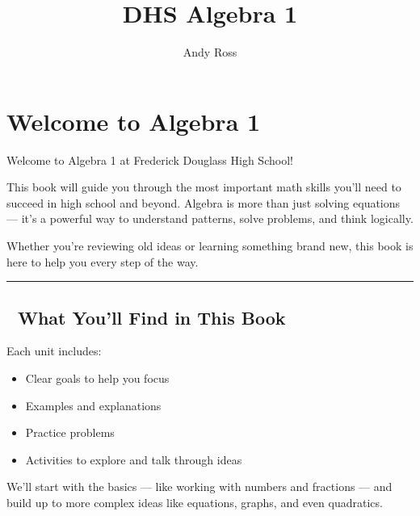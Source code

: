 \documentclass[
  letterpaper,
]{scrrept}
\title{DHS Algebra 1}
\author{Andy Ross}
\date{}
\providecommand{\tightlist}{%
  \setlength{\itemsep}{0pt}\setlength{\parskip}{0pt}}
\renewcommand*\contentsname{Table of contents}
\newcommand\contentsname{Table of contents}
\begin{document}
\maketitle

\renewcommand*\contentsname{Table of contents}
{
\hypersetup{linkcolor=}
\setcounter{tocdepth}{2}
\tableofcontents
}


\chapter*{Welcome to Algebra 1}\label{welcome-to-algebra-1}


Welcome to Algebra 1 at Frederick Douglass High School!

This book will guide you through the most important math skills you'll
need to succeed in high school and beyond. Algebra is more than just
solving equations --- it's a powerful way to understand patterns, solve
problems, and think logically.

Whether you're reviewing old ideas or learning something brand new, this
book is here to help you every step of the way.

\begin{center}\rule{0.5\linewidth}{0.5pt}\end{center}

\section*{🧭 What You'll Find in This
Book}\label{what-youll-find-in-this-book}


Each unit includes:

\begin{itemize}
\tightlist
\item
  Clear goals to help you focus
\item
  Examples and explanations
\item
  Practice problems
\item
  Activities to explore and talk through ideas
\end{itemize}

We'll start with the basics --- like working with numbers and fractions
--- and build up to more complex ideas like equations, graphs, and even
quadratics.
\end{document}
